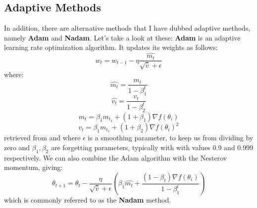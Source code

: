 \documentclass{article}
\begin{document}
\subsection{Adaptive Methods}
In addition, there are alternative methods that I have dubbed adaptive methods, namely \textbf{Adam} and \textbf{Nadam}. Let's take a look at these:
\newline \textbf{Adam} is an adaptive learning rate optimization algorithm. It updates its weights as follows:
\begin{equation}
    w_t = w_{t-1} - \eta \frac{\hat{m_t}}{\sqrt{\hat{v}} + \epsilon}
\end{equation}
where:
\begin{equation*}
    \hat{m_t} = \frac{m_t}{1-\beta^t_1}
\end{equation*}
\begin{equation*}
    \hat{v_t} = \frac{v_t}{1-\beta^t_2}
\end{equation*}
\begin{equation*}
    m_t = \beta_1 m_{t_1} + (1+\beta_1)\nabla f(\theta_i)
\end{equation*}
\begin{equation*}
    v_t = \beta_1 m_{t_1} + (1+\beta_2)\nabla f(\theta_i)^2
\end{equation*}
retrieved from \cite{Adam} and where $\epsilon$ is a smoothing parameter, to keep us from dividing by zero and $\beta_1,\beta_2$ are forgetting parameters, typically with with values 0.9 and 0.999 respectively. \newline
We can also combine the Adam algorithm with the Nesterov momentum, giving:
\begin{equation}
    \theta_{t+1} = \theta_t - \frac{\eta}{\sqrt{\hat{v}}+\epsilon} \left(\beta_1 \hat{m_t} + \frac{(1-\beta_t)\nabla f(\theta_i)}{1 - \beta^t_1}\right)
\end{equation}
which is commonly referred to as the \textbf{Nadam} method.
\end{document}
